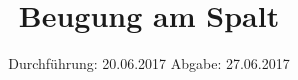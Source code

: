 


\subject{V406}
\title{\texorpdfstring{Beugung am Spalt}{}}
\date{
	Durchführung: 20.06.2017
	\hspace{4em}
	Abgabe: 27.06.2017
}


	\maketitle
	\newpage
	\tableofcontents
	\newpage
	
	
	
	
	
	
	\newpage

	\printbibliography
